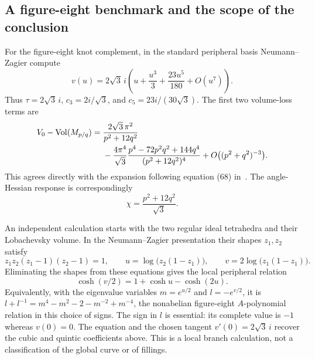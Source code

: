 \subsection{A figure-eight benchmark and the scope of the conclusion}

For the figure-eight knot complement, in the standard peripheral
basis Neumann--Zagier compute~\cite[equation (68)]{NeumannZagier}
\begin{equation}
 v(u)=2\sqrt3\,i\left(u+\frac{u^3}{3}
                    +\frac{23u^5}{180}+O(u^7)\right).
 \label{eq:figureeightNZcoefficients}
\end{equation}
Thus $\tau=2\sqrt3\,i$, $c_3=2i/\sqrt3$, and
$c_5=23i/(30\sqrt3)$. The first two volume-loss terms are
\begin{align}
 V_0-\operatorname{Vol}(M_{p/q})={}&\frac{2\sqrt3\,\pi^2}{p^2+12q^2}\notag\\
 &-\frac{4\pi^4}{\sqrt3}
  \frac{p^4-72p^2q^2+144q^4}{(p^2+12q^2)^4}
  +O\bigl((p^2+q^2)^{-3}\bigr).
 \label{eq:figureeightfillingloss}
\end{align}
This agrees directly with the expansion following equation (68)
in~\cite{NeumannZagier}. The angle-Hessian response is correspondingly
\[
 \chi=\frac{p^2+12q^2}{\sqrt3}.
\]

An independent calculation starts with the two regular ideal tetrahedra
and their Lobachevsky volume. In the Neumann--Zagier presentation their
shapes $z_1,z_2$ satisfy
\[
 z_1z_2(z_1-1)(z_2-1)=1,\qquad
 u=\log\bigl(z_2(1-z_1)\bigr),\qquad
 v=2\log\bigl(z_1(1-z_1)\bigr).
\]
Eliminating the shapes from these equations gives the local peripheral
relation
\[
 \cosh(v/2)=1+\cosh u-\cosh(2u).
\]
Equivalently, with the eigenvalue variables
$m=e^{u/2}$ and $l=-e^{v/2}$, it is
$l+l^{-1}=m^4-m^2-2-m^{-2}+m^{-4}$, the nonabelian
figure-eight $A$-polynomial relation in this choice of signs.
The sign in $l$ is essential: its complete value is $-1$ whereas
$v(0)=0$. The equation and the chosen tangent $v'(0)=2\sqrt3\,i$
recover the cubic and quintic coefficients above. This is a local
branch calculation, not a classification of the global curve or of fillings.

